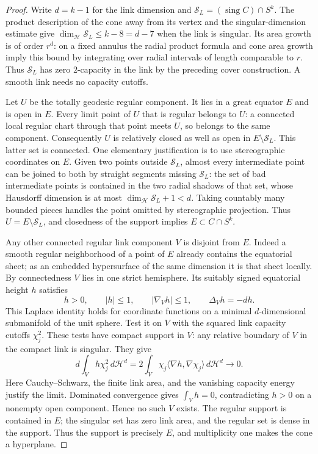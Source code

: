 \begin{proof}
Write $d=k-1$ for the link dimension and
$\mathcal S_L=(\operatorname{sing}C)\cap S^k$.
The product description of the cone away from its vertex and the
singular-dimension estimate give
$\dim_{\mathcal H}\mathcal S_L\leq k-8=d-7$ when the link is
singular.  Its area growth is of order $r^d$: on a fixed annulus the
radial product formula and cone area growth imply this bound by
integrating over radial intervals of length comparable to $r$.
Thus $\mathcal S_L$ has zero $2$-capacity in the link by the preceding
cover construction.  A smooth link needs no capacity cutoffs.

Let $U$ be the totally geodesic regular component.  It lies in a
great equator $E$ and is open in $E$.  Every limit point of $U$ that
is regular belongs to $U$: a connected local regular chart through
that point meets $U$, so belongs to the same component.  Consequently
$U$ is relatively closed as well as open in $E\setminus\mathcal S_L$.
This latter set is connected.  One elementary justification is to
use stereographic coordinates on $E$.  Given two points outside
$\mathcal S_L$, almost every intermediate point can be joined to both
by straight segments missing $\mathcal S_L$: the set of bad
intermediate points is contained in the two radial shadows of that
set, whose Hausdorff dimension is at most
$\dim_{\mathcal H}\mathcal S_L+1<d$.  Taking countably many bounded
pieces handles the point omitted by stereographic projection.
Thus $U=E\setminus\mathcal S_L$, and closedness of the support implies
$E\subset C\cap S^k$.

Any other connected regular link component $V$ is disjoint from $E$.
Indeed a smooth regular neighborhood of a point of $E$ already
contains the equatorial sheet; as an embedded hypersurface of the
same dimension it is that sheet locally.  By connectedness $V$ lies
in one strict hemisphere.  Its suitably signed equatorial height
$h$ satisfies
\[
 h>0,\qquad |h|\leq1,\qquad |\nabla_Vh|\leq1,
 \qquad \Delta_Vh=-d h.
\]
This Laplace identity holds for coordinate functions on a minimal
$d$-dimensional submanifold of the unit sphere.
Test it on $V$ with the squared link capacity cutoffs $\chi_j^2$.
These tests have compact support in $V$: any relative boundary of
$V$ in the compact link is singular.  They give
\[
 d\int_Vh\chi_j^2\,d\mathcal H^d
 =2\int_V\chi_j\langle\nabla h,\nabla\chi_j\rangle\,d\mathcal H^d
 \longrightarrow0.
\]
Here Cauchy--Schwarz, the finite link area, and the vanishing
capacity energy justify the limit.  Dominated convergence gives
$\int_Vh=0$, contradicting $h>0$ on a nonempty open component.
Hence no such $V$ exists.  The regular support is contained in $E$;
the singular set has zero link area, and the regular set is dense in
the support.  Thus the support is precisely $E$, and multiplicity
one makes the cone a hyperplane.
\end{proof}

